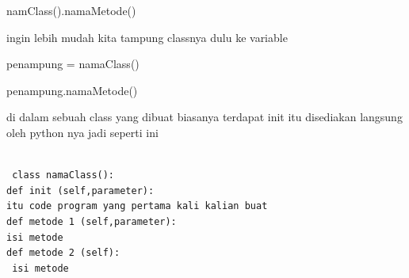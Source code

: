 \noindent 
{\fontsize{14pt}{14pt}\selectfont namClass().namaMetode() \\} \par
\vspace{14pt}
\noindent 
{\fontsize{14pt}{14pt}\selectfont ingin lebih mudah kita tampung classnya dulu ke variable  \\} \par
\vspace{14pt}
\noindent 
{\fontsize{14pt}{14pt}\selectfont penampung = namaClass() \\} \par
\noindent 
{\fontsize{14pt}{14pt}\selectfont penampung.namaMetode() \\} \par
\vspace{14pt}
\noindent 
{\fontsize{14pt}{14pt}\selectfont di dalam sebuah class yang dibuat biasanya terdapat init itu disediakan langsung oleh python nya jadi seperti ini \\} \par


\begin{verbatim}

 class namaClass():
def init (self,parameter):
itu code program yang pertama kali kalian buat
def metode 1 (self,parameter):
isi metode
def metode 2 (self):
 isi metode
 
 \end{verbatim}
 
